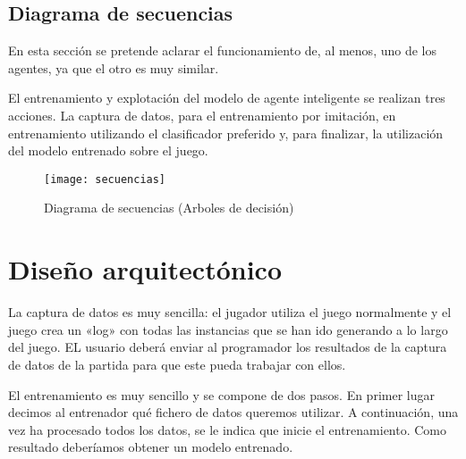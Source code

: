 \subsection {Diagrama de secuencias}
En esta sección se pretende aclarar el funcionamiento de, al menos, uno de los agentes, ya que el otro es muy similar.

El entrenamiento y explotación del modelo de agente inteligente se realizan tres acciones. La captura de datos, para el entrenamiento por imitación, en entrenamiento utilizando el clasificador preferido y, para finalizar, la utilización del modelo entrenado sobre el juego. 


\begin{figure}
    \centering
    \texttt{[image: secuencias]}
    \caption{Diagrama de secuencias (Arboles de decisión)}
    \label{fig:d_sec}
\end{figure}

\section{Diseño arquitectónico}

La captura de datos es muy sencilla: el jugador utiliza el juego normalmente y el juego crea un «log» con todas las instancias que se han ido generando a lo largo del juego. EL usuario deberá enviar al programador los resultados de la captura de datos de la partida para que este pueda trabajar con ellos.

El entrenamiento es muy sencillo y se compone de dos pasos. En primer lugar decimos al entrenador qué fichero de datos queremos utilizar. A continuación, una vez ha procesado todos los datos, se le indica que inicie el entrenamiento. Como resultado deberíamos obtener un modelo entrenado.

